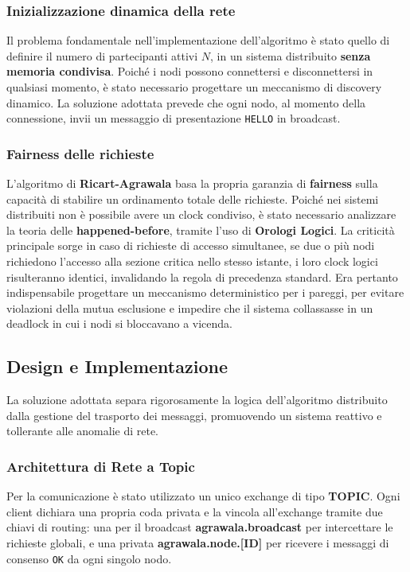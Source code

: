 \subsubsection{Inizializzazione dinamica della rete}
\label{discovery}
Il problema fondamentale nell'implementazione dell'algoritmo è stato quello di definire il numero di partecipanti attivi $N$, in un sistema distribuito \textbf{senza memoria condivisa}. Poiché i nodi possono connettersi e disconnettersi in qualsiasi momento, è stato necessario progettare un meccanismo di discovery dinamico. 
La soluzione adottata prevede che ogni nodo, al momento della connessione, invii un messaggio di presentazione \texttt{HELLO} in broadcast. 

\subsubsection{Fairness delle richieste}
L'algoritmo di \textbf{Ricart-Agrawala} basa la propria garanzia di \textbf{fairness} sulla capacità di stabilire un ordinamento totale delle richieste. Poiché nei sistemi distribuiti non è possibile avere un clock condiviso, è stato necessario analizzare la teoria delle \textbf{happened-before}, tramite l'uso di \textbf{Orologi Logici}.
La criticità principale sorge in caso di richieste di accesso simultanee, se due o più nodi richiedono l'accesso alla sezione critica nello stesso istante, i loro clock logici risulteranno identici, invalidando la regola di precedenza standard. Era pertanto indispensabile progettare un meccanismo deterministico per i pareggi, per evitare violazioni della mutua esclusione e impedire che il sistema collassasse in un deadlock in cui i nodi si bloccavano a vicenda.

\subsection{Design e Implementazione}
La soluzione adottata separa rigorosamente la logica dell'algoritmo distribuito dalla gestione del trasporto dei messaggi, promuovendo un sistema reattivo e tollerante alle anomalie di rete.

\subsubsection{Architettura di Rete a Topic}
Per la comunicazione è stato utilizzato un unico exchange di tipo \textbf{TOPIC}. Ogni client dichiara una propria coda privata e la vincola all'exchange tramite due chiavi di routing: una per il broadcast \textbf{agrawala.broadcast} per intercettare le richieste globali, e una privata \textbf{agrawala.node.[ID]} per ricevere i messaggi di consenso \texttt{OK} da ogni singolo nodo.

